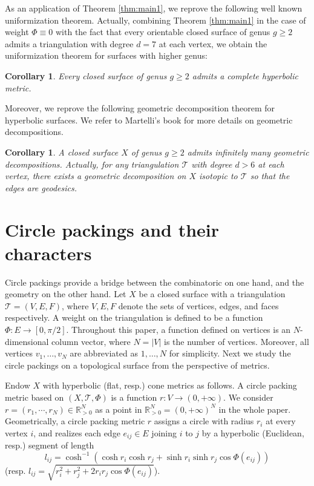 \documentclass[12pt]{amsart}
\numberwithin{equation}{section}
\newtheorem{cor}[prop]{Corollary}
\begin{document}
As an application of Theorem \ref{thm:main1}, we reprove the following well known uniformization theorem.
Actually, combining Theorem \ref{thm:main1} in the case of weight $\Phi \equiv 0$ with the fact that every orientable
closed surface of genus $g \geq 2$ admits a triangulation with degree $d = 7$ at each vertex, we obtain
the uniformization theorem for surfaces with higher genus:

\begin{cor}\label{cor:uniformization}
Every closed surface of genus $g \geq 2$ admits a complete hyperbolic metric.
\end{cor}

Moreover, we reprove the following geometric decomposition theorem for hyperbolic surfaces. We refer
to Martelli's book \cite{Martelli} for more details on geometric decompositions.

\begin{cor}\label{cor:geometric}
A closed surface $X$ of genus $g \geq 2$ admits infinitely many geometric decompositions.
Actually, for any triangulation $\mathcal{T}$ with degree $d > 6$ at each vertex, there exists a geometric decomposition
on $X$ isotopic to $\mathcal{T}$ so that the edges are geodesics.
\end{cor}

\section{Circle packings and their characters}\label{sec:circle}

Circle packings provide a bridge between the combinatoric on one hand, and the geometry on the other
hand. Let $X$ be a closed surface with a triangulation $\mathcal{T} = (V,E,F)$, where $V,E,F$ denote the sets
of vertices, edges, and faces respectively. A weight on the triangulation is defined to be a function
$\Phi : E \to [0,\pi/2]$. Throughout this paper, a function defined on vertices is an $N$-dimensional column
vector, where $N = |V|$ is the number of vertices. Moreover, all vertices $v_1, \ldots, v_N$ are abbreviated as
$1, \ldots, N$ for simplicity. Next we study the circle packings on a topological surface from the perspective
of metrics.

Endow $X$ with hyperbolic (flat, resp.) cone metrics as follows. A circle packing metric based on
$(X,\mathcal{T},\Phi)$ is a function $r : V \to (0,+\infty)$. We consider $r = (r_1, \cdots, r_N) \in \mathbb{R}^N_{>0}$ as a point in $\mathbb{R}^N_{>0} =
(0,+\infty)^N$ in the whole paper. Geometrically, a circle packing metric $r$ assigns a circle with radius $r_i$ at
every vertex $i$, and realizes each edge $e_{ij} \in E$ joining $i$ to $j$ by a hyperbolic (Euclidean, resp.) segment
of length
\begin{equation}\label{eq:hyp-edge}
l_{ij} = \cosh^{-1}(\cosh r_i \cosh r_j + \sinh r_i \sinh r_j \cos\Phi(e_{ij}))
\end{equation}
(resp. $l_{ij} = \sqrt{r_i^2 + r_j^2 + 2r_i r_j \cos\Phi(e_{ij})}$).
\end{document}
